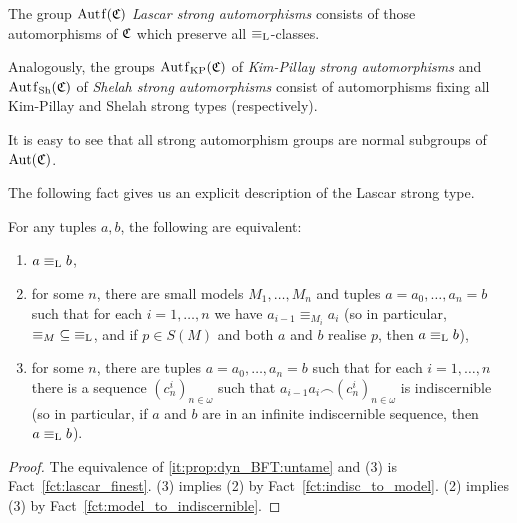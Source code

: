 	
	\begin{dfn}
		\label{dfn:autf_L}
		The group $\Autf(\fC)$ \emph{Lascar strong automorphisms} consists of those automorphisms of ${\mathfrak C}$ which preserve all $\equiv_{\mathrm{L}}$-classes.
		
		Analogously, the groups $\Autf_\KP(\fC)$ of \emph{Kim-Pillay strong automorphisms} and $\Autf_\Sh(\fC)$ of \emph{Shelah strong automorphisms} consist of automorphisms fixing all Kim-Pillay and Shelah strong types (respectively).\xqed{\lozenge}
	\end{dfn}
	
	
	\begin{rem}
		It is easy to see that all strong automorphism groups are normal subgroups of $\operatorname{{Aut}}({\mathfrak C})$.\xqed{\lozenge}
	\end{rem}
	
	The following fact gives us an explicit description of the Lascar strong type.
	\begin{fct}
		\label{fct:Lascar_equivalent}
		For any tuples $a,b$, the following are equivalent:
		\begin{enumerate}
			\item
			$a\equiv_{\mathrm{L}} b$,
			\item
			for some $n$, there are small models $M_1,\ldots, M_n$ and tuples $a=a_0,\ldots,a_n=b$ such that for each $i=1,\ldots,n$ we have $a_{i-1}\equiv_{M_{i}} a_{i}$ (so in particular, ${\equiv_M}\subseteq {\equiv_{\mathrm{L}}}$, and if $p\in S(M)$ and both $a$ and $b$ realise $p$, then $a\equiv_{\mathrm{L}} b$),
			\item
			for some $n$, there are tuples $a=a_0,\ldots,a_n=b$ such that for each $i=1,\ldots,n$ there is a sequence $(c_n^i)_{n\in \omega}$ such that $a_{i-1}a_{i}\frown (c^i_n)_{n\in \omega}$ is indiscernible (so in particular, if $a$ and $b$ are in an infinite indiscernible sequence, then $a\equiv_{\mathrm{L}} b$).
		\end{enumerate}
	\end{fct}
	\begin{proof}
		The equivalence of \ref{it:prop:dyn_BFT:untame} and (3) is Fact~\ref{fct:lascar_finest}. (3) implies (2) by Fact~\ref{fct:indisc_to_model}. (2) implies (3) by Fact~\ref{fct:model_to_indiscernible}.
	\end{proof}
	
